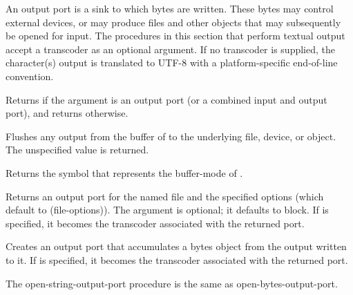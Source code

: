 An output port is a sink to which bytes are written. These bytes may control
external devices, or may produce files and other objects that may
subsequently be opened for input.  The procedures in this section
that perform
textual output accept a transcoder as an optional argument.  If no
transcoder is supplied, the character(s) output is translated to
UTF-8 with a platform-specific end-of-line convention.

\begin{entry}{%
}
   
Returns \schtrue{} if the argument is an output port (or a
combined input and output port), and returns \schfalse{} otherwise.
\end{entry}   

\begin{entry}{%
}
   
Flushes any output from the buffer of  to the
underlying file, device, or object. The unspecified value is returned.
\end{entry}

\begin{entry}{%
}
   
Returns the symbol that represents the buffer-mode of
.
\end{entry}

\begin{entry}{%
}

Returns an output port for the named file and the specified
options (which default to {\cf (file-options)}). The 
argument is optional; it defaults to {\cf block}.  If 
is specified, it becomes the transcoder associated with the returned
port.
\end{entry}   

\begin{entry}{%
}

Creates an output port that accumulates a bytes object from the
output written to it.  If  is specified, it becomes
the transcoder associated with the returned port.

The {\cf open-string-output-port} procedure is the same as {\cf
  open-bytes-output-port}.
\end{entry}

